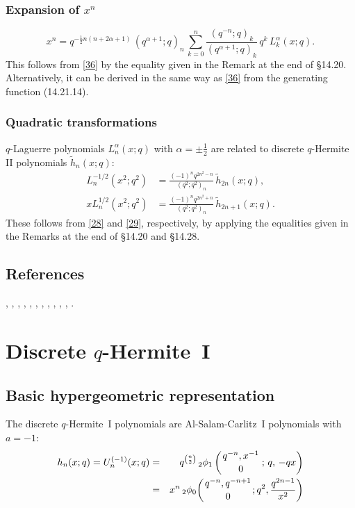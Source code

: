 \documentclass[envcountchap,graybox]{svmono}
\newcounter{rom}
\newcommand{\qhyp}[5]{\mbox{}_{#1}{\phi}_{#2}
\left(\genfrac{}{}{0pt}{}{#3}{#4}\,;\,q,\,#5\right)}
\newcommand{\qhypK}[5]{\,\mbox{}_{#1}\phi_{#2}\!\left(
  \genfrac{}{}{0pt}{}{#3}{#4};#5\right)}
\newcommand\al\alpha
\newcommand\half{\frac12}
\newcommand\wt{\widetilde}
\newcommand{\qhyp}[5]{\,\mbox{}_{#1}\phi_{#2}\!\left(
  \genfrac{}{}{0pt}{}{#3}{#4};#5\right)}
\begin{document}
{{\subsubsection*{Expansion of $x^n$}
\begin{equation}
x^n=q^{-\half n(n+2\al+1)}\,(q^{\al+1};q)_n\,
\sum_{k=0}^n\frac{(q^{-n};q)_k}{(q^{\al+1};q)_k}\,q^k\,L_k^\al(x;q).
\label{37}
\end{equation}
This follows from \eqref{36} by the equality given in the Remark at the end
of \S14.20. Alternatively, it can be derived in the same way as \eqref{36}
from the generating function (14.21.14).
%
\subsubsection*{Quadratic transformations}
$q$-Laguerre polynomials $L_n^\al(x;q)$ with $\al=\pm\half$ are
related to discrete $q$-Hermite II polynomials $\wt h_n(x;q)$:
\begin{align}
L_n^{-1/2}(x^2;q^2)&=
\frac{(-1)^n q^{2n^2-n}}{(q^2;q^2)_n}\,\wt h_{2n}(x;q),
\label{38}\\
xL_n^{1/2}(x^2;q^2)&=
\frac{(-1)^n q^{2n^2+n}}{(q^2;q^2)_n}\,\wt h_{2n+1}(x;q).
\label{39}
\end{align}
These follows from \eqref{28} and \eqref{29}, respectively, by applying
the equalities given in the Remarks at the end of \S14.20 and \S14.28.
%

\subsection*{References}
\cite{Askey86}, \cite{Askey89I}, \cite{AtakAtakIII}, \cite{Chihara70}, \cite{Chihara78},
\cite{Dehesa}, \cite{Ismail2005I}, \cite{Nikiforov+}, \cite{Stieltjes}, \cite{Szego75},
\cite{ValentAssche}, \cite{Wigert}.


\section{Discrete $q$-Hermite~I}
\par\setcounter{equation}{0}

\subsection*{Basic hypergeometric representation}
The discrete $q$-Hermite~I polynomials are Al-Salam-Carlitz~I polynomials
with $a=-1$:
\begin{eqnarray}
\label{DefDiscreteqHermiteI}
h_n(x;q)=U_n^{(-1)}(x;q)&=&q^{\binom{n}{2}}\,\qhyp{2}{1}{q^{-n},x^{-1}}{0}{-qx}\\
&=&x^n\qhypK{2}{0}{q^{-n},q^{-n+1}}{0}{q^2,\frac{q^{2n-1}}{x^2}}\nonumber
\end{eqnarray}

}}
\end{document}
